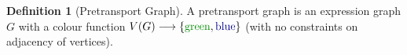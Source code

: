 \documentclass{amsart}
\renewcommand{\to}[1][]{\stackrel{#1}{\longrightarrow}}
\newcommand{\curly}[1]{\left\{ #1 \right\}}
\newcommand{\set}[2][]{\ifthenelse{\equal{#1}{}}
                                  {\curly{#2}}
                                  {\curly{#1\ \textbf{:}\ #2}}}
\newcommand{\Cob}{\textbf{Cob}}
\newcommand{\midarrow}[3][0.5]{
\coordinate (s) at (#2);
\coordinate (t) at (#3);
\coordinate (midarrowmid) at ($(s) + #1*(t) - #1*(s)$);
\draw[->] (#2)          -- (midarrowmid);
\draw     (midarrowmid) -- (#3);
}
\numberwithin{thm}{section}
\theoremstyle{definition}
\newtheorem{defn}[thm]{Definition}
\newtheorem{rmk}[thm]{Remark}
\begin{document}
%
%
%
%


\begin{defn}[Pretransport Graph]
A pretransport graph is an expression graph $G$ with a colour function
$V(G) \to \set{{\color{green!55!black}\text{green}},
{\color{blue!55!black}\text{blue}}}$ (with no constraints on adjacency of
vertices).
\end{defn}
\end{document}

